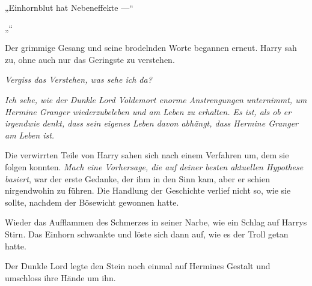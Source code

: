 „Einhornblut hat Nebeneffekte —“

„“

Der grimmige Gesang und seine brodelnden Worte begannen erneut.
Harry sah zu, ohne auch nur das Geringste zu verstehen.

\emph{Vergiss das Verstehen, was sehe ich da?}

\emph{Ich sehe, wie der Dunkle Lord Voldemort enorme Anstrengungen unternimmt, um Hermine Granger wiederzubeleben und am Leben zu erhalten. Es ist, als ob er irgendwie denkt, dass sein eigenes Leben davon abhängt, dass Hermine Granger am Leben ist.}

Die verwirrten Teile von Harry sahen sich nach einem Verfahren um, dem sie folgen konnten. \emph{Mach eine Vorhersage, die auf deiner besten aktuellen Hypothese basiert}, war der erste Gedanke, der ihm in den Sinn kam, aber er schien nirgendwohin zu führen. Die Handlung der Geschichte verlief nicht so, wie sie sollte, nachdem der Bösewicht gewonnen hatte.

Wieder das Aufflammen des Schmerzes in seiner Narbe, wie ein Schlag auf Harrys Stirn. Das Einhorn schwankte und löste sich dann auf, wie es der Troll getan hatte.

Der Dunkle Lord legte den Stein noch einmal auf Hermines Gestalt und umschloss ihre Hände um ihn.

